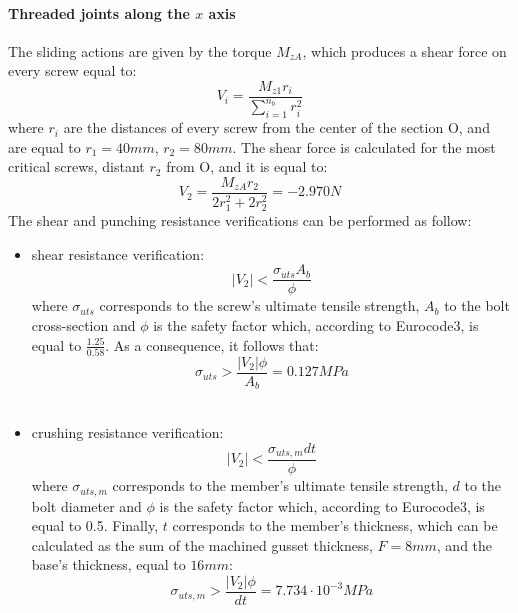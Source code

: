 \paragraph{Threaded joints along the $x$ axis} The sliding actions are given by the torque $M_{zA}$, which produces a shear force on every screw equal to:\\
\begin{equation*}
    V_{i} = \frac{M_{z1}r_{i}}{\sum\limits_{i=1}^{n_{{b}}} r^2_{i}}
\end{equation*}
where $r_{i}$ are the distances of every screw from the center of the section O, and are equal to $r_{1} = 40 mm$, $r_{2} = 80 mm$. 
The shear force is calculated for the most critical screws, distant $r_{2}$ from O, and it is equal to:\\
\begin{equation*}
    V_{2} = \frac{M_{zA}r_{2}}{2r^2_{1}+2r^2_{2}} = - 2.970 N
\end{equation*}
The shear and punching resistance verifications can be performed as follow:
\begin{itemize}
    \item shear resistance verification:
    \begin{equation*}
        |V_{2}| < \frac{\sigma_{uts}A_{b}}{\phi}
    \end{equation*}
    where $\sigma_{uts}$ corresponds to the screw's ultimate tensile strength, $A_{b}$ to the bolt cross-section and $\phi$ is the safety factor which, according to Eurocode3, is equal to $\frac{1.25}{0.58}$.
    As a consequence, it follows that:
    \begin{equation*}
       \sigma_{uts} > \frac{|V_{2}|\phi}{A_{b}} = 0.127 MPa
    \end{equation*}\\
    \item crushing resistance verification:
    \begin{equation*}
        |V_{2}| < \frac{\sigma_{uts,m}dt}{\phi}
    \end{equation*}
    where $\sigma_{uts,m}$ corresponds to the member's ultimate tensile strength, $d$ to the bolt diameter and $\phi$ is the safety factor which, according to Eurocode3, is equal to 0.5. Finally, $t$ corresponds to the member's thickness, which can be calculated as the sum of the machined gusset thickness, $F = 8 mm$, and the base's thickness, equal to $16 mm$:
     \begin{equation*}
       \sigma_{uts,m} > \frac{|V_{2}|\phi}{dt} = 7.734 \cdot 10^{-3} MPa
    \end{equation*}
\end{itemize}
